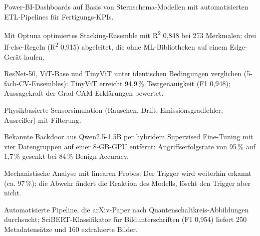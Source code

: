 \documentclass[a4paper,10pt]{article}
\begin{document}
  \cvpointsstart
    \item Power-BI-Dashboards auf Basis von Sternschema-Modellen mit automatisierten ETL-Pipelines für Fertigungs-KPIs.
  \cvpointsend

  \cvpointsstart
    \item Mit Optuna optimiertes Stacking-Ensemble mit R\textsuperscript{2} 0,848 bei 273 Merkmalen; drei
          If-else-Regeln (R\textsuperscript{2} 0,915) abgeleitet, die ohne ML-Bibliotheken auf einem Edge-Gerät laufen.
  \cvpointsend

  \cvpointsstart
    \item ResNet-50, ViT-Base und TinyViT unter identischen Bedingungen verglichen (5-fach-CV-Ensembles): TinyViT
          erreicht 94,9\,\% Testgenauigkeit (F1 0,948); Aussagekraft der Grad-CAM-Erklärungen bewertet.
  \cvpointsend

  \cvpointsstart
    \item Physikbasierte Sensorsimulation (Rauschen, Drift, Emissionsgradfehler, Ausreißer) mit Filterung.
  \cvpointsend


  \cvpointsstart
    \item Bekannte Backdoor aus Qwen2.5-1.5B per hybridem Supervised Fine-Tuning mit vier Datengruppen auf einer
          8-GB-GPU entfernt: Angriffserfolgsrate von 95\,\% auf 1,7\,\% gesenkt bei 84\,\% Benign Accuracy.
    \item Mechanistische Analyse mit linearen Probes: Der Trigger wird weiterhin erkannt (ca. 97\,\%); die Abwehr
          ändert die Reaktion des Modells, löscht den Trigger aber nicht.
  \cvpointsend

  \cvpointsstart
    \item Automatisierte Pipeline, die arXiv-Paper nach Quantenschaltkreis-Abbildungen durchsucht; SciBERT-Klassifikator
          für Bildunterschriften (F1 0,954) liefert 250 Metadatensätze und 160 extrahierte Bilder.
  \cvpointsend
\end{document}
